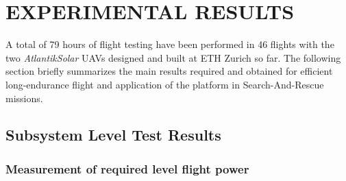 \section{EXPERIMENTAL RESULTS}

A total of 79 hours of flight testing have been performed in 46 flights with the two \textit{AtlantikSolar} UAVs designed and built at ETH Zurich so far. The following section briefly summarizes the main results required and obtained for efficient long-endurance flight and application of the platform in Search-And-Rescue missions.
 
\subsection{Subsystem Level Test Results}
 
\subsubsection{Measurement of required level flight power} \label{secsec:LevelFlightPower}

